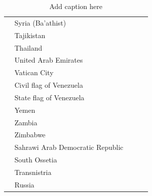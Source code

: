 \documentclass[11pt]{amsart}
\begin{document}
\begin{table}[h]
\begin{tabular}{lllll}
        & Syria (Ba'athist) & & & \\
        & Tajikistan & & & \\
        & Thailand & & & \\
        & United Arab Emirates & & & \\
        & Vatican City & & & \\
        & Civil flag of Venezuela & & & \\
        & State flag of Venezuela & & & \\
        & Yemen & & & \\
        & Zambia & & & \\
        & Zimbabwe & & & \\
        & Sahrawi Arab Democratic Republic & & & \\
        & South Ossetia & & & \\
        & Transnistria & & & \\
        & Russia & & & \\
        \hline
    \end{tabular}
    \caption{Add caption here}
    \label{tab:flags_table}
\end{table}
\end{document}
